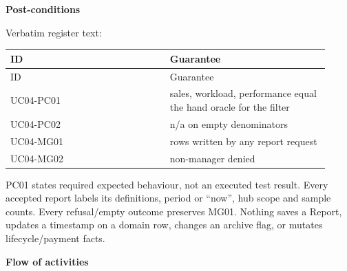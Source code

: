\textbf{Post-conditions}

Verbatim register text:

\begin{longtable}{>{\raggedright\arraybackslash}p{0.4600\linewidth}>{\raggedright\arraybackslash}p{0.4600\linewidth}}
ID & Guarantee \\
\hline\endfirsthead
ID & Guarantee \\
\hline\endhead
UC04-PC01 & sales, workload, performance equal the hand oracle for the filter \\
UC04-PC02 & n/a on empty denominators \\
UC04-MG01 & 0 rows written by any report request \\
UC04-MG02 & non-manager denied \\
\end{longtable}
PC01 states required expected behaviour, not an executed test result. Every accepted report labels its definitions, period or ``now'', hub scope and sample counts. Every refusal/empty outcome preserves MG01. Nothing saves a Report, updates a timestamp on a domain row, changes an archive flag, or mutates lifecycle/payment facts.

\textbf{Flow of activities}

